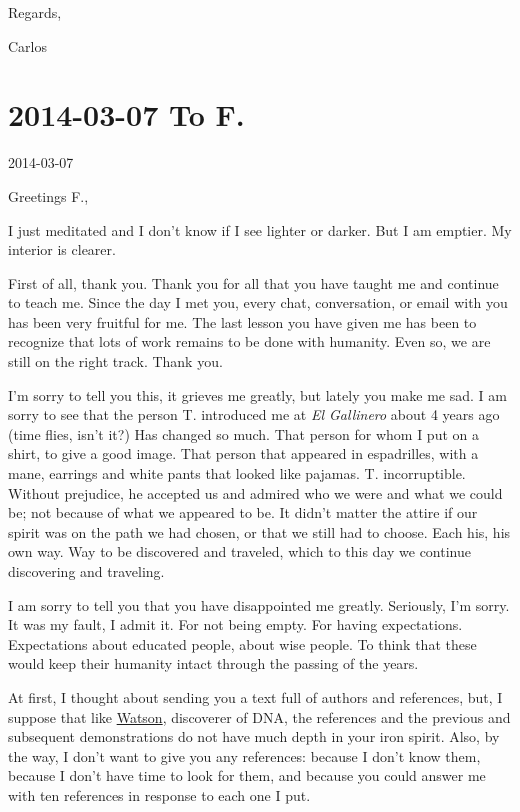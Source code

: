 \documentclass[]{book}
\begin{document}
Regards,

Carlos

\hypertarget{toF20140307}{%
\section*{2014-03-07 To F.}\label{toF20140307}}

2014-03-07

Greetings F.,

I just meditated and I don't know if I see lighter or darker. But I am emptier. My interior is clearer.

First of all, thank you. Thank you for all that you have taught me and continue to teach me. Since the day I met you, every chat, conversation, or email with you has been very fruitful for me. The last lesson you have given me has been to recognize that lots of work remains to be done with humanity. Even so, we are still on the right track. Thank you.

I'm sorry to tell you this, it grieves me greatly, but lately you make me sad. I am sorry to see that the person T. introduced me at \emph{El Gallinero} about 4 years ago (time flies, isn't it?) Has changed so much. That person for whom I put on a shirt, to give a good image. That person that appeared in espadrilles, with a mane, earrings and white pants that looked like pajamas. T. incorruptible. Without prejudice, he accepted us and admired who we were and what we could be; not because of what we appeared to be. It didn't matter the attire if our spirit was on the path we had chosen, or that we still had to choose. Each his, his own way. Way to be discovered and traveled, which to this day we continue discovering and traveling.

I am sorry to tell you that you have disappointed me greatly. Seriously, I'm sorry. It was my fault, I admit it. For not being empty. For having expectations. Expectations about educated people, about wise people. To think that these would keep their humanity intact through the passing of the years.

At first, I thought about sending you a text full of authors and references, but, I suppose that like \href{https://en.wikipedia.org/wiki/James_Watson\#Comments_on_race}{Watson}, discoverer of DNA, the references and the previous and subsequent demonstrations do not have much depth in your iron spirit. Also, by the way, I don't want to give you any references: because I don't know them, because I don't have time to look for them, and because you could answer me with ten references in response to each one I put.
\end{document}
